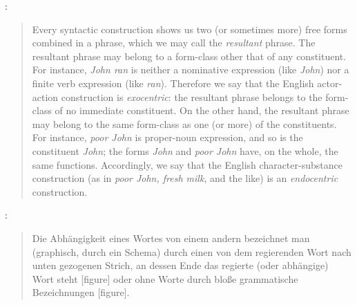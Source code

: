 {    \noindent\citet[section 12.10]{bloomfield1933language} :

    \begin{quote}
    Every syntactic construction shows us two (or sometimes more) free forms combined in a phrase, which we may call the \textit{resultant} phrase. The resultant phrase may belong to a form-class other that of any constituent. For instance, \textit{John ran} is neither a nominative expression (like \textit{John}) nor a finite verb expression (like \textit{ran}). Therefore we say that the English actor-action construction is \textit{exocentric}: the resultant phrase belongs to the form-class of no immediate constituent. On the other hand, the resultant phrase may belong to the same form-class as one (or more) of the constituents. For instance, \textit{poor John} is proper-noun expression, and so is the constituent \textit{John}; the forms \textit{John} and \textit{poor John} have, on the whole, the same functions. Accordingly, we say that the English character-substance construction (as in \textit{poor John, fresh milk}, and the like) is an \textit{endocentric} construction.
    \end{quote}


    \noindent\citet[10]{kern1883zur} :

    \begin{quote}
    Die Abhängigkeit eines Wortes von einem andern bezeichnet man (graphisch, durch ein Schema) durch einen von dem regierenden Wort nach unten gezogenen Strich, an dessen Ende das regierte (oder abhängige) Wort steht [figure] oder ohne Worte durch bloße grammatische Bezeichnungen [figure].
    \end{quote}
}

